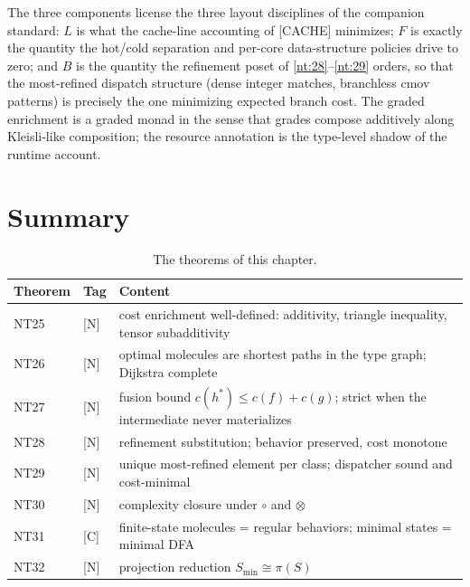 \begin{remark}
The three components license the three layout disciplines of the
companion standard: $L$ is what the cache-line accounting of [CACHE]
minimizes; $F$ is exactly the quantity the hot/cold separation and
per-core data-structure policies drive to zero; and $B$ is the quantity
the refinement poset of \ref{nt:28}--\ref{nt:29} orders, so that the
most-refined dispatch structure (dense integer matches, branchless
cmov patterns) is precisely the one minimizing expected branch cost.
The graded enrichment is a graded monad in the sense that grades
compose additively along Kleisli-like composition; the resource
annotation is the type-level shadow of the runtime account.
\end{remark}
\section{Summary}\label{sec:enrich-summary}

\begin{table}[htbp]
\centering
\begin{tabular}{@{}lll@{}}
\toprule
\textbf{Theorem} & \textbf{Tag} & \textbf{Content} \\
\midrule
NT25 & [N] & cost enrichment well-defined: additivity, triangle inequality, tensor subadditivity \\
NT26 & [N] & optimal molecules are shortest paths in the type graph; Dijkstra complete \\
NT27 & [N] & fusion bound $c(h^{*}) \le c(f) + c(g)$; strict when the intermediate never materializes \\
NT28 & [N] & refinement substitution; behavior preserved, cost monotone \\
NT29 & [N] & unique most-refined element per class; dispatcher sound and cost-minimal \\
NT30 & [N] & complexity closure under $\circ$ and $\otimes$ \\
NT31 & [C] & finite-state molecules = regular behaviors; minimal states = minimal DFA \\
NT32 & [N] & projection reduction $S_{\min} \cong \pi(S)$ \\
\bottomrule
\end{tabular}
\caption{The theorems of this chapter.}
\label{tab:enrich}
\end{table}

